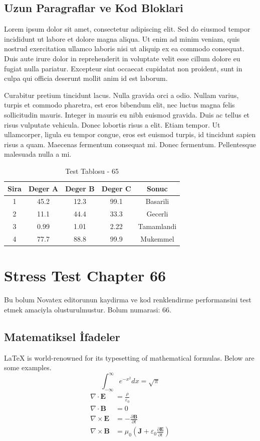 \documentclass[12pt,a4paper]{article}
\begin{document}
\subsection{Uzun Paragraflar ve Kod Bloklari}
Lorem ipsum dolor sit amet, consectetur adipiscing elit. Sed do eiusmod tempor incididunt ut labore et dolore magna aliqua. Ut enim ad minim veniam, quis nostrud exercitation ullamco laboris nisi ut aliquip ex ea commodo consequat. Duis aute irure dolor in reprehenderit in voluptate velit esse cillum dolore eu fugiat nulla pariatur. Excepteur sint occaecat cupidatat non proident, sunt in culpa qui officia deserunt mollit anim id est laborum.

Curabitur pretium tincidunt lacus. Nulla gravida orci a odio. Nullam varius, turpis et commodo pharetra, est eros bibendum elit, nec luctus magna felis sollicitudin mauris. Integer in mauris eu nibh euismod gravida. Duis ac tellus et risus vulputate vehicula. Donec lobortis risus a elit. Etiam tempor. Ut ullamcorper, ligula eu tempor congue, eros est euismod turpis, id tincidunt sapien risus a quam. Maecenas fermentum consequat mi. Donec fermentum. Pellentesque malesuada nulla a mi.

\begin{table}[h!]
\centering
\begin{tabular}{|c|c|c|c|c|}
\hline
\textbf{Sira} & \textbf{Deger A} & \textbf{Deger B} & \textbf{Deger C} & \textbf{Sonuc} \\
\hline
1 & 45.2 & 12.3 & 99.1 & Basarili \\
2 & 11.1 & 44.4 & 33.3 & Gecerli \\
3 & 0.99 & 1.01 & 2.22 & Tamamlandi \\
4 & 77.7 & 88.8 & 99.9 & Mukemmel \\
\hline
\end{tabular}
\caption{Test Tablosu - 65}
\end{table}

\newpage
\section{Stress Test Chapter 66}
Bu bolum Novatex editorunun kaydirma ve kod renklendirme performansini test etmek amaciyla olusturulmustur. Bolum numarasi: 66.

\subsection{Matematiksel İfadeler}
\LaTeX{} is world-renowned for its typesetting of mathematical formulas. Below are some examples.
\begin{equation}
\int_{-\infty}^{\infty} e^{-x^2} dx = \sqrt{\pi}
\end{equation}
\begin{align}
\nabla \cdot \mathbf{E} &= \frac{\rho}{\varepsilon_0} \\
\nabla \cdot \mathbf{B} &= 0 \\
\nabla \times \mathbf{E} &= -\frac{\partial \mathbf{B}}{\partial t} \\
\nabla \times \mathbf{B} &= \mu_0\left(\mathbf{J} + \varepsilon_0 \frac{\partial \mathbf{E}}{\partial t}\right)
\end{align}
\end{document}
